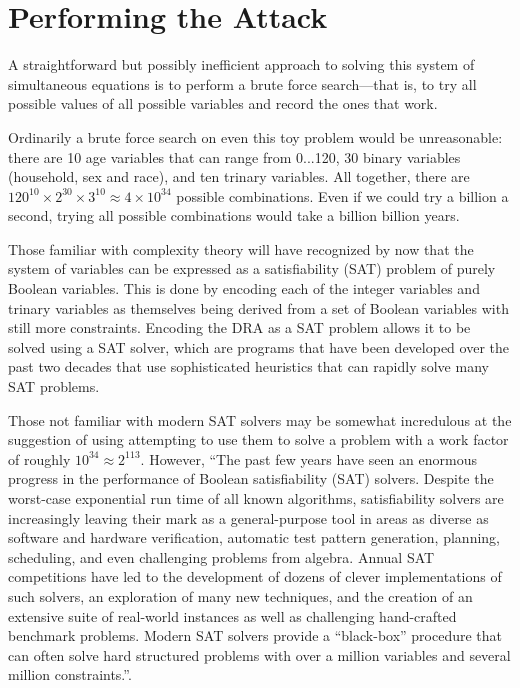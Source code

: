 \documentclass[runningheads]{llncs}
\begin{document}
\section{Performing the Attack}
A straightforward but possibly inefficient approach to solving this
system of simultaneous equations is to perform a brute force
search---that is, to try all possible values of all possible variables
and record the ones that work.

Ordinarily a brute force search on even this toy problem would be
unreasonable: there are 10 age variables that can range from 0...120,
30 binary variables (household, sex and race), and ten trinary
variables. All together, there are $120^{10} \times 2^{30} \times
3^{10} \approx 4 \times 10^{34}$ possible combinations. Even if we
could try a billion a second, trying all possible combinations would
take a billion billion years.

Those familiar with complexity theory will have recognized by now that
the system of variables can be expressed as a satisfiability (SAT)
problem of purely Boolean variables. This is done by encoding each of the
integer variables and trinary variables as themselves being derived
from a set of Boolean variables with still more constraints. Encoding
the DRA as a SAT problem allows it to be solved using a SAT solver, which are 
programs that have been developed over the past two
decades that use sophisticated heuristics that can rapidly solve many
SAT problems. 

Those not familiar with modern SAT solvers may be somewhat
incredulous at the suggestion of using attempting to use them to solve
a problem with a work factor of roughly $10^{34}\approx2^{113}$.
However, ``The past few years have seen an enormous progress in the performance
of Boolean satisfiability (SAT) solvers. Despite the worst-case
exponential run time of all known algorithms, satisfiability solvers
are increasingly leaving their mark as a general-purpose tool in areas
as diverse as software and hardware verification,
automatic test pattern generation, planning,
scheduling, and even challenging problems from algebra. Annual SAT
competitions have led to the development of dozens 
of clever implementations of such solvers, an exploration of many new
techniques, and the creation of an extensive suite of real-world
instances as well as challenging hand-crafted benchmark
problems. Modern SAT solvers provide a ``black-box'' procedure that
can often solve hard structured problems with over a million variables and
several million constraints.''\cite[references omitted]{Gomes200889}.
\end{document}
